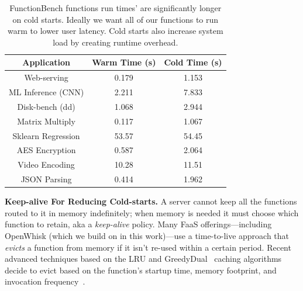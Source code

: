 \begin{table}
  \centering
\caption{FunctionBench \cite{kim_functionbench_2019} functions run times' are significantly longer on cold starts. Ideally we want all of our functions to run warm to lower user latency. Cold starts also increase system load by creating runtime overhead.}
\label{tab:func-times}
  \begin{tabular}{ c c c }
\hline
  Application & Warm Time (s) & Cold Time (s) \\ 
\hline
  Web-serving & 0.179 & 1.153 \\  
  ML Inference (CNN) & 2.211 & 7.833 \\
  Disk-bench (dd) & 1.068 & 2.944 \\  
  Matrix Multiply & 0.117 & 1.067 \\  
  Sklearn Regression & 53.57 & 54.45 \\  
  AES Encryption & 0.587 & 2.064 \\  
  Video Encoding & 10.28 & 11.51 \\  
  JSON Parsing & 0.414 & 1.962 \\
\hline
\end{tabular}
\end{table}



\noindent \textbf{Keep-alive For Reducing Cold-starts.}
A server cannot keep all the functions routed to it in memory indefinitely; when memory is needed it must choose which function to retain, aka a \emph{keep-alive} policy.
Many FaaS offerings---including OpenWhisk (which we build on in this work)---use a time-to-live approach that \emph{evicts} a function from memory if it isn't re-used within a certain period.
%
Recent advanced techniques based on the LRU and GreedyDual~\cite{gdsf} caching algorithms decide to evict based on the function's startup time, memory footprint, and invocation frequency~\cite{faascache-asplos21}.

